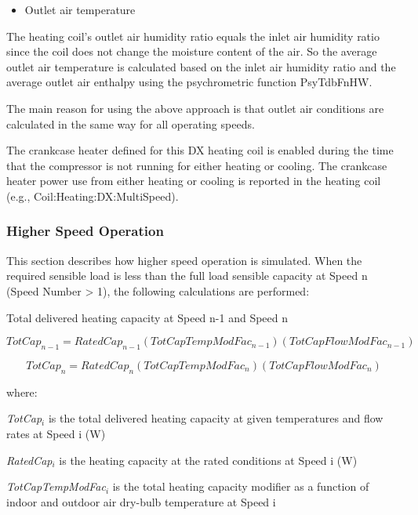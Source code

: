 \begin{itemize}
  \item Outlet air temperature
\end{itemize}

The heating coil's outlet air humidity ratio equals the inlet air humidity ratio since the coil does not change the moisture content of the air. So the average outlet air temperature is calculated based on the inlet air humidity ratio and the average outlet air enthalpy using the psychrometric function PsyTdbFnHW.

The main reason for using the above approach is that outlet air conditions are calculated in the same way for all operating speeds.

The crankcase heater defined for this DX heating coil is enabled during the time that the compressor is not running for either heating or cooling. The crankcase heater power use from either heating or cooling is reported in the heating coil (e.g., Coil:Heating:DX:MultiSpeed).

\subsubsection{Higher Speed Operation}\label{higher-speed-operation-2}

This section describes how higher speed operation is simulated. When the required sensible load is less than the full load sensible capacity at Speed n (Speed Number \textgreater{} 1), the following calculations are performed:

Total delivered heating capacity at Speed n-1 and Speed n

\begin{equation}
  TotCa{p_{n - 1}} = RatedCa{p_{n - 1}}\left( {TotCapTempModFa{c_{n - 1}}} \right)\left( {TotCapFlowModFa{c_{n - 1}}} \right)
\end{equation}

\begin{equation}
  TotCa{p_n} = RatedCa{p_n}\left( {TotCapTempModFa{c_n}} \right)\left( {TotCapFlowModFa{c_n}} \right)
\end{equation}

where:

\emph{TotCap\(_{i}\)} is the total delivered heating capacity at given temperatures and flow rates at Speed i (W)

\emph{RatedCap\(_{i}\)} is the heating capacity at the rated conditions at Speed i (W)

\emph{TotCapTempModFac\(_{i}\)} is the total heating capacity modifier as a function of indoor and outdoor air dry-bulb temperature at Speed i

